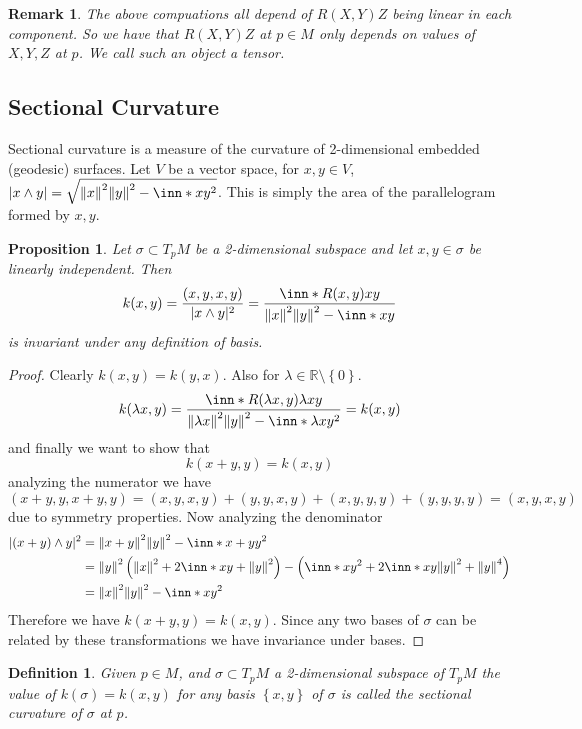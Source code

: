 \documentclass[a4paper]{article}
\newtheorem*{prop}{Proposition}
\newtheorem*{defn}{Definition}
\newtheorem*{rem}{Remark}
\begin{document}
\begin{rem}
  The above compuations all depend of $R(X,Y)Z$ being linear in each component. So we have that $R(X,Y)Z$ at $p \in M$ only depends on values of $X,Y,Z$ at $p$. We call such an object a tensor.
\end{rem}

\subsection*{Sectional Curvature}%
Sectional curvature is a measure of the curvature of 2-dimensional embedded (geodesic) surfaces. Let $V$ be a vector space, for $x,y \in V$, $| x \wedge y| = \sqrt{\norm{x}^2\norm{y}^2 - \inn*{x}{y}^2}$. This is simply the area of the parallelogram formed by $x,y$. 

\begin{prop}
  Let $\sigma \subset T_pM$ be a 2-dimensional subspace and let $x,y \in \sigma$ be linearly independent. Then
  \[
    k(x,y) =  \frac{(x,y,x,y)}{|x \wedge y|^2} = \frac{\inn*{R(x,y)x}{y}}{\norm{x}^2\norm{y}^2 - \inn*{x}{y}}
  \]
  is invariant under any definition of basis.
\end{prop}
\begin{proof}
  Clearly $k(x,y) = k(y,x)$. Also for $\lambda \in \mathds{R} \setminus \left\{ 0 \right\}$.
  \[
    k(\lambda x, y) = \frac{\inn*{R(\lambda x, y) \lambda x}{y}}{\norm{\lambda x}^2 \norm{y}^2 - \inn*{\lambda x}{y}^2} = k(x,y)
  \]
  and finally we want to show that
  \[
    k(x + y, y) = k(x,y) 
  \]
  analyzing the numerator we have
  \[
    (x + y, y, x+y, y) = (x,y, x,y) + (y,y,x,y) + (x,y,y,y) + (y,y,y,y) = (x,y,x,y)
  \]
  due to symmetry properties. Now analyzing the denominator
  \[
    \begin{aligned}
      |(x + y) \wedge y|^2 &= \norm{x + y}^2 \norm{y}^2 - \inn*{x+y}{y}^2 \\ 
                           &= \norm{y}^2 \left( \norm{x}^2 + 2 \inn*{x}{y} + \norm{y}^2 \right) - \left( \inn*{x}{y}^2 + 2 \inn*{x}{y} \norm{y}^2 + \norm{y}^4 \right) \\
                           &= \norm{x}^2\norm{y}^2 - \inn*{x}{y}^2
    \end{aligned}
  \]
  Therefore we have $k(x+y,y) = k(x,y)$. Since any two bases of $\sigma$ can be related by these transformations we have invariance under bases.
\end{proof}

\begin{defn}
  Given $p \in M$, and $\sigma \subset T_pM$ a 2-dimensional subspace of $T_pM$ the value of $k(\sigma) = k(x,y)$ for any basis $\left\{ x,y \right\}$ of $\sigma$ is called the sectional curvature of $\sigma$ at $p$.
\end{defn}
\end{document}
